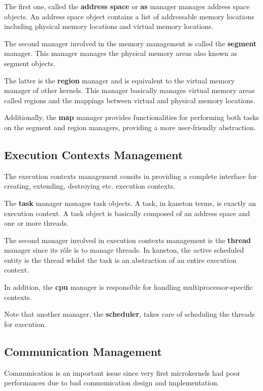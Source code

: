 The first one, called the \textbf{address space} or \textbf{as} manager
manages address space objects. An address space object contains a list of
addressable memory locations including physical memory locations and virtual
memory locations.

The second manager involved in the memory management is called the
\textbf{segment} manager. This manager manages the physical memory areas
also known as segment objects.

The latter is the \textbf{region} manager and is equivalent to the
virtual memory manager of other kernels. This manager basically manages
virtual memory areas called regions and the mappings between virtual and
physical memory locations.

Additionally, the \textbf{map} manager provides functionalities for performing
both tasks on the segment and region managers, providing a more user-friendly
abstraction.


\subsection*{Execution Contexts Management}

The execution contexts management consits in providing a complete interface
for creating, extending, destroying etc. execution contexts.

The \textbf{task} manager manages task objects. A task, in kaneton terms, is
exactly an execution context. A task object is basically composed of an
address space and one or more threads.

The second manager involved in execution contexts management is the
\textbf{thread} manager since its r\^ole is to manage threads. In kaneton, the
active scheduled entity is the thread whilst the task is an abstraction of an
entire execution context.

In addition, the \textbf{cpu} manager is responsible for handling
multiprocessor-specific contexts.

Note that another manager, the \textbf{scheduler}, takes care of scheduling
the threads for execution.


\subsection*{Communication Management}

Communication is an important issue since very first microkernels had poor
performances due to bad communication design and implementation.

